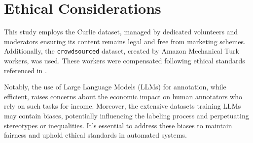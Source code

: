 \section{Ethical Considerations}\label{sec:ethical-considerations}
This study employs the Curlie dataset, managed by dedicated volunteers and moderators ensuring its content remains legal and free from marketing schemes. 
Additionally, the \texttt{crowdsourced} dataset, created by Amazon Mechanical Turk workers, was used. 
These workers were compensated following ethical standards referenced in \cite{ethics1, ethics2, homepage2vec}.



Notably, the use of Large Language Models (LLMs) for annotation, while efficient, raises concerns about the economic impact on human annotators who rely on such tasks for income. 
Moreover, the extensive datasets training LLMs may contain biases, potentially influencing the labeling process and perpetuating stereotypes or inequalities. 
It's essential to address these biases to maintain fairness and uphold ethical standards in automated systems.